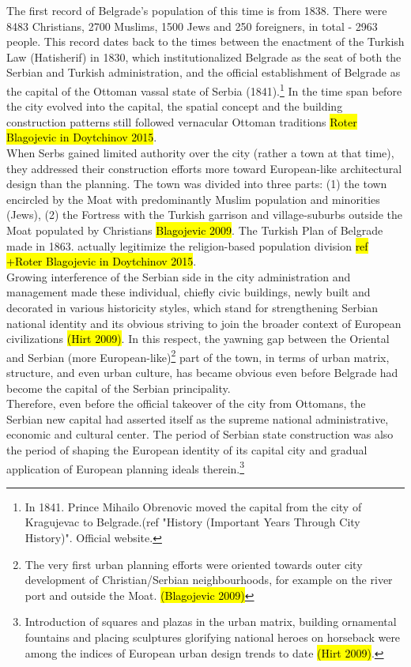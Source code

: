 \documentclass[11pt]{report}
\begin{document}
The first record of Belgrade’s population of this time is from 1838.
There were 8483 Christians, 2700 Muslims, 1500 Jews and 250 foreigners, in total - 2963 people.
This record dates back to the times between the enactment of the Turkish Law (Hatisherif) in 1830, which institutionalized Belgrade as the seat of both the Serbian and Turkish administration, and the official establishment of Belgrade as the capital of the Ottoman vassal state of Serbia (1841).\footnote{In 1841. Prince Mihailo Obrenovic moved the capital from the city of Kragujevac to Belgrade.(ref "History (Important Years Through City History)". Official website.}
In the time span before the city evolved into the capital, the spatial concept and the building construction patterns still followed vernacular Ottoman traditions \hl{Roter Blagojevic in Doytchinov 2015}.
\\
When Serbs gained limited authority over the city (rather a town at that time), they addressed their construction efforts more toward European-like architectural design than the planning. The town was divided into three parts: (1) the town encircled by the Moat with predominantly Muslim population and minorities (Jews),
(2) the Fortress with the Turkish garrison and village-suburbs outside the Moat populated by Christians \hl{Blagojevic 2009}.
The Turkish Plan of Belgrade made in 1863. actually legitimize the religion-based population division \hl{ref +Roter Blagojevic in Doytchinov 2015}.
\\
Growing interference of the Serbian side in the city administration and management made these individual, chiefly civic buildings, newly built and decorated in various historicity styles, which stand for strengthening Serbian national identity and its obvious striving to join the broader context of European civilizations \hl{(Hirt 2009)}.
In this respect, the yawning gap between the Oriental and Serbian (more European-like)\footnote{The very first urban planning efforts were oriented towards outer city development of Christian/Serbian neighbourhoods, for example on the river port and outside the Moat. \hl{(Blagojevic 2009)}}
part of the town, in terms of urban matrix, structure, and even urban culture, has became obvious even before Belgrade had become the capital of the Serbian principality.
\\
Therefore, even before the official takeover of the city from Ottomans, the Serbian new capital had asserted itself as the supreme national administrative, economic and cultural center.
The period of Serbian state construction was also the period of shaping the European identity of its capital city and gradual application of European planning ideals therein.\footnote{Introduction of squares and plazas in the urban matrix, building ornamental fountains and placing sculptures glorifying national heroes on horseback were among the indices of European urban design trends to date \hl{(Hirt 2009)}.}
\end{document}
